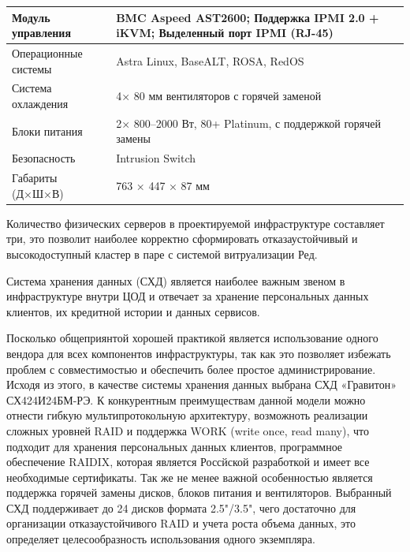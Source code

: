 \documentclass[14pt, a4paper]{extarticle}
\begin{document}
\begin{tabularx}{\textwidth}{|l|X|}
  Модуль управления                    & BMC Aspeed AST2600; Поддержка IPMI 2.0 + iKVM; Выделенный порт IPMI (RJ-45)                                                                                       \\\hline
  Операционные системы                 & Astra Linux, BaseALT, ROSA, RedOS                                                                                                                                 \\\hline
  Система охлаждения                   & 4× 80 мм вентиляторов с горячей заменой                                                                                                                           \\
  Блоки питания                        & 2× 800–2000 Вт, 80+ Platinum, с поддержкой горячей замены                                                                                                         \\\hline
  Безопасность                         & Intrusion Switch                                                                                                                                                  \\\hline
  Габариты (Д×Ш×В)                     & 763 × 447 × 87 мм                                                                                                                                                 \\\hline
\end{tabularx}

Количество физических серверов в проектируемой инфраструктуре составляет три, это позволит
наиболее корректно сформировать отказаустойчивый и высокодоступный кластер в паре с
системой витруализации Ред.

Система хранения данных (СХД) является наиболее важным звеном в инфраструктуре внутри ЦОД
и отвечает за хранение персональных данных клиентов, их кредитной истории и данных сервисов.

Посколько общеприянтой хорошей практикой является использование одного вендора для всех
компонентов инфраструктуры, так как это позволяет избежать проблем с совместимостью и
обеспечить более простое администрирование. Исходя из этого, в качестве системы хранения
данных выбрана СХД «Гравитон» СХ424И24БМ-РЭ. К конкурентным преимуществам данной модели
можно отнести гибкую мультипротокольную архитектуру, возможноть реализации сложных
уровней RAID и поддержка WORK (write once, read many), что подходит для хранения
персональных данных клиентов, программное обеспечение RAIDIX, которая является
Россйской разработкой и имеет все необходимые сертификаты. Так же не менее важной
особенностью является поддержка горячей замены дисков, блоков питания и вентиляторов.
Выбранный СХД поддерживает до 24 дисков формата 2.5"/3.5", чего достаточно для организации
отказаустойчивого RAID и учета роста объема данных, это определяет целесообразность
использования одного экземпляра.
\end{document}
